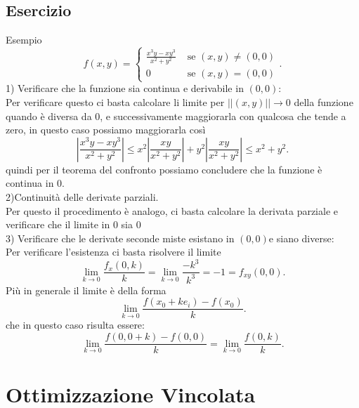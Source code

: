 \documentclass[12px]{article}
\begin{document}
	\subsection{Esercizio}
	Esempio
	\[
	f(x,y) = \begin{cases}
		\frac{x^3y-xy^3}{x^2 + y^2} &\text{ se } (x,y)\neq(0,0)\\
		0 &\text{ se } (x,y) = (0,0)
	\end{cases}
	.\] 
	1) Verificare che la funzione sia continua e derivabile in $(0,0)$:\\
	Per verificare questo ci basta calcolare li limite per $||(x,y)|| \rightarrow 0$ della funzione quando è diversa da 0, e successivamente maggiorarla con qualcosa che tende a zero, in questo caso possiamo maggiorarla così
	\[
		\left|\frac{x^3y-xy^3}{x^2 + y^2}\right|\leq x^2\left|\frac{xy}{x^2 + y^2}\right| + y^2\left|\frac{xy}{x^2 + y^2}\right|\leq x^2 + y^2
	.\] 
	quindi per il teorema del confronto possiamo concludere che la funzione è continua in 0.\\
	2)Continuità delle derivate parziali.\\
	Per questo il procedimento è analogo, ci basta calcolare la derivata parziale e verificare che il limite in 0 sia 0\\
	3) Verificare che le derivate seconde miste esistano in $(0,0)$e siano diverse:\\
	Per verificare l'esistenza ci basta risolvere il limite
	\[
		\lim_{k \rightarrow 0}\frac{f_x(0,k)}k = \lim_{k \rightarrow 0} \frac{-k^3}{k^3} = -1 = f_{xy}(0,0)
	.\] 
	Più in generale il limite è della forma 
	\[
		\lim_{k \rightarrow 0}\frac{f(x_0 + ke_i)-f(x_0)}{k}
	.\] 
	che in questo caso risulta essere:\\
	\[
		\lim_{k \rightarrow 0}\frac{f(0,0 + k)-f(0,0)}{k}= 
\lim_{k \rightarrow 0}\frac{f(0,k)}{k}
	
	.\] 
	\section{Ottimizzazione Vincolata}
\end{document}
